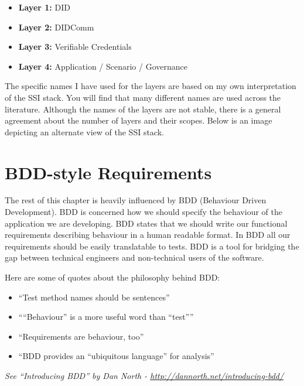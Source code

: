\begin{itemize}
\tightlist
\item
  \textbf{Layer 1:} DID
\item
  \textbf{Layer 2:} DIDComm
\item
  \textbf{Layer 3:} Verifiable Credentials
\item
  \textbf{Layer 4:} Application / Scenario / Governance
\end{itemize}

The specific names I have used for the layers are based on my own
interpretation of the SSI stack. You will find that many different names
are used across the literature. Although the names of the layers are not
stable, there is a general agreement about the number of layers and
their scopes. Below is an image depicting an alternate view of the SSI
stack.



\hypertarget{bdd-style-requirements}{%
\section{BDD-style Requirements}\label{bdd-style-requirements}}

The rest of this chapter is heavily influenced by BDD (Behaviour Driven
Development). BDD is concerned how we should specify the behaviour of
the application we are developing. BDD states that we should write our
functional requirements describing behaviour in a human readable format.
In BDD all our requirements should be easily translatable to tests. BDD
is a tool for bridging the gap between technical engineers and
non-technical users of the software.






Here are some of quotes about the philosophy behind BDD:

\begin{itemize}
\tightlist
\item
  ``Test method names should be sentences''
\item
  ````Behaviour'' is a more useful word than ``test''''
\item
  ``Requirements are behaviour, too''
\item
  ``BDD provides an ``ubiquitous language'' for analysis''
\end{itemize}

\emph{See ``Introducing BDD'' by Dan North -
\url{http://dannorth.net/introducing-bdd/}}



